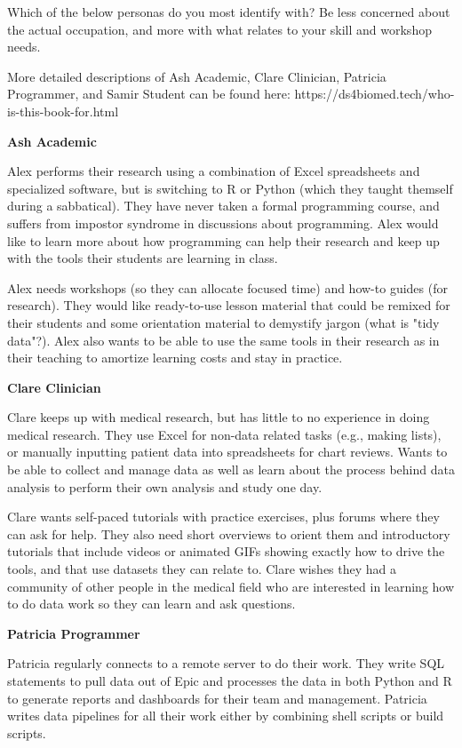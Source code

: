 \documentclass[030-workshop.tex]{subfiles}
\begin{document}
Which of the below personas do you most identify with? Be less concerned about the actual occupation, and more with what relates to your skill and workshop needs.

More detailed descriptions of Ash Academic, Clare Clinician, Patricia Programmer, and Samir Student can be found here: https://ds4biomed.tech/who-is-this-book-for.html


\textbf{Ash Academic}

 Alex performs their research using a combination of Excel spreadsheets and specialized software,
 but is switching to R or Python (which they taught themself during a sabbatical).
 They have never taken a formal programming course, and suffers from impostor syndrome in discussions about programming.
 Alex would like to learn more about how programming can help their research and keep up with the tools their students are learning in class.

 Alex needs workshops (so they can allocate focused time) and how-to guides (for research).
 They would like ready-to-use lesson material that could be remixed for their students and some orientation material to demystify jargon (what is "tidy data"?).
 Alex also wants to be able to use the same tools in their research as in their teaching to amortize learning costs and stay in practice.

\textbf{Clare Clinician}

 Clare keeps up with medical research, but has little to no experience in doing medical research.
 They use Excel for non-data related tasks (e.g., making lists), or manually inputting patient data into spreadsheets for chart reviews.
 Wants to be able to collect and manage data as well as learn about the process behind data analysis to perform their own analysis and study one day.

Clare wants self-paced tutorials with practice exercises, plus forums where they can ask for help.
 They also need short overviews to orient them and introductory tutorials that include videos or animated GIFs showing exactly how to drive the tools,
 and that use datasets they can relate to.
 Clare wishes they had a community of other people in the medical field who are interested in learning how to do data work so they can learn and ask questions.

\textbf{Patricia Programmer}

 Patricia regularly connects to a remote server to do their work.
 They write SQL statements to pull data out of Epic and processes the data in both Python and R to generate reports and dashboards for their team and management.
 Patricia writes data pipelines for all their work either by combining shell scripts or build scripts.
\end{document}
